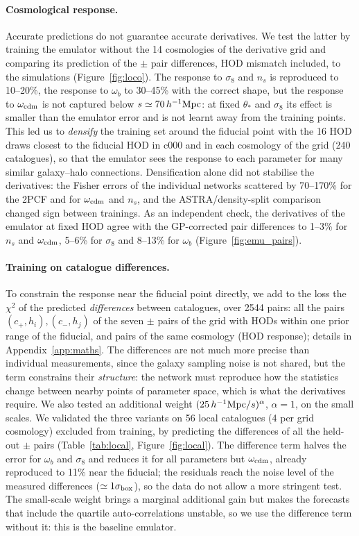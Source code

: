 \paragraph{Cosmological response.} Accurate predictions do not guarantee accurate derivatives. We test the latter by training the emulator without the 14 cosmologies of the derivative grid and comparing its prediction of the $\pm$ pair differences, HOD mismatch included, to the simulations (Figure~\ref{fig:loco}). The response to $\sigma_8$ and $n_s$ is reproduced to 10--20\%, the response to $\omega_b$ to 30--45\% with the correct shape, but the response to $\omega_{\rm cdm}$ is not captured below $s\simeq70\,h^{-1}\mathrm{Mpc}$: at fixed $\theta_*$ and $\sigma_8$ its effect is smaller than the emulator error and is not learnt away from the training points. This led us to \emph{densify} the training set around the fiducial point with the 16 HOD draws closest to the fiducial HOD in c000 and in each cosmology of the grid (240 catalogues), so that the emulator sees the response to each parameter for many similar galaxy--halo connections. Densification alone did not stabilise the derivatives: the Fisher errors of the individual networks scattered by 70--170\% for the 2PCF and for $\omega_{\rm cdm}$ and $n_s$, and the ASTRA/density-split comparison changed sign between trainings. As an independent check, the derivatives of the emulator at fixed HOD agree with the GP-corrected pair differences to 1--3\% for $n_s$ and $\omega_{\rm cdm}$, 5--6\% for $\sigma_8$ and 8--13\% for $\omega_b$ (Figure~\ref{fig:emu_pairs}).

\paragraph{Training on catalogue differences.} To constrain the response near the fiducial point directly, we add to the loss the $\chi^2$ of the predicted \emph{differences} between catalogues, over 2544 pairs: all the pairs $(c_+,h_i),(c_-,h_j)$ of the seven $\pm$ pairs of the grid with HODs within one prior range of the fiducial, and pairs of the same cosmology (HOD response); details in Appendix~\ref{app:maths}. The differences are not much more precise than individual measurements, since the galaxy sampling noise is not shared, but the term constrains their \emph{structure}: the network must reproduce how the statistics change between nearby points of parameter space, which is what the derivatives require. We also tested an additional weight $(25\,h^{-1}\mathrm{Mpc}/s)^\alpha$, $\alpha=1$, on the small scales. We validated the three variants on 56 local catalogues (4 per grid cosmology) excluded from training, by predicting the differences of all the held-out $\pm$ pairs (Table~\ref{tab:local}, Figure~\ref{fig:local}). The difference term halves the error for $\omega_b$ and $\sigma_8$ and reduces it for all parameters but $\omega_{\rm cdm}$, already reproduced to 11\% near the fiducial; the residuals reach the noise level of the measured differences ($\simeq1\sigma_{\rm box}$), so the data do not allow a more stringent test. The small-scale weight brings a marginal additional gain but makes the forecasts that include the quartile auto-correlations unstable, so we use the difference term without it: this is the baseline emulator.

